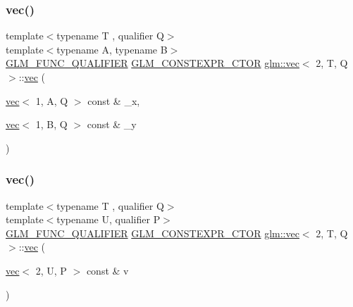 \mbox{\label{structglm_1_1vec_3_012_00_01_t_00_01_q_01_4_a2801c2c65b9d873d5d5008688f7339a6}} 
\subsubsection{\texorpdfstring{vec()}{vec()}\hspace{0.1cm}{\footnotesize\ttfamily [14/17]}}
{\footnotesize\ttfamily template$<$typename T , qualifier Q$>$ \\
template$<$typename A, typename B$>$ \\
\hyperlink{setup_8hpp_a33fdea6f91c5f834105f7415e2a64407}{G\+L\+M\+\_\+\+F\+U\+N\+C\+\_\+\+Q\+U\+A\+L\+I\+F\+I\+ER} \hyperlink{setup_8hpp_ad34178a09666081abdb573c14d1f4a5a}{G\+L\+M\+\_\+\+C\+O\+N\+S\+T\+E\+X\+P\+R\+\_\+\+C\+T\+OR} \hyperlink{structglm_1_1vec}{glm\+::vec}$<$ 2, T, Q $>$\+::\hyperlink{structglm_1_1vec}{vec} (\begin{DoxyParamCaption}\item[{\hyperlink{structglm_1_1vec}{vec}$<$ 1, A, Q $>$ const \&}]{\+\_\+x,  }\item[{\hyperlink{structglm_1_1vec}{vec}$<$ 1, B, Q $>$ const \&}]{\+\_\+y }\end{DoxyParamCaption})}

\mbox{\label{structglm_1_1vec_3_012_00_01_t_00_01_q_01_4_aa42a169b552cd4f61ee71641723d2d9b}} 
\subsubsection{\texorpdfstring{vec()}{vec()}\hspace{0.1cm}{\footnotesize\ttfamily [15/17]}}
{\footnotesize\ttfamily template$<$typename T , qualifier Q$>$ \\
template$<$typename U, qualifier P$>$ \\
\hyperlink{setup_8hpp_a33fdea6f91c5f834105f7415e2a64407}{G\+L\+M\+\_\+\+F\+U\+N\+C\+\_\+\+Q\+U\+A\+L\+I\+F\+I\+ER} \hyperlink{setup_8hpp_ad34178a09666081abdb573c14d1f4a5a}{G\+L\+M\+\_\+\+C\+O\+N\+S\+T\+E\+X\+P\+R\+\_\+\+C\+T\+OR} \hyperlink{structglm_1_1vec}{glm\+::vec}$<$ 2, T, Q $>$\+::\hyperlink{structglm_1_1vec}{vec} (\begin{DoxyParamCaption}\item[{\hyperlink{structglm_1_1vec}{vec}$<$ 2, U, P $>$ const \&}]{v }\end{DoxyParamCaption})}


